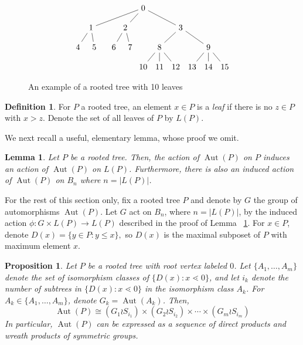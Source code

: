 \documentclass[smallextended, envcountsame, numbook]{svjour3}
\theoremstyle{plain}
\newtheorem{prop}[thm]{Proposition}
\newtheorem{lem}[thm]{Lemma}
\theoremstyle{definition}
\newtheorem{defn}[thm]{Definition}
\theoremstyle{remark}
\numberwithin{equation}{section}
\newcommand\Aut{\operatorname{Aut}}
\begin{document}
\begin{figure}[h!]
\[\begin{tikzpicture}[scale=.7]
  \node (0) at (-4,0) {$4$};
  \node (1) at (-3,0) {$5$};
  \node (2) at (-1.8,0) {$6$};
  \node (3) at (-0.8,0) {$7$};
    \node (4) at (0,-1.2) {$10$};
  \node (5) at (1,-1.2) {$11$};
  \node (6) at (2,-1.2) {$12$};
  \node (7) at (3,-1.2) {$13$};
  \node (8) at (4,-1.2) {$14$};
  \node (9) at (5,-1.2) {$15$};
  \node (10) at (1, 0) {$8$};
  \node (11) at (4,0) {$9$};
    \node (12) at (-3.2,1.2) {$1$};
  \node (13) at (-1.1,1.2) {$2$};
  \node (14) at (2.3,1.2) {$3$};
  \node (15) at (0,2.4) {$0$};
 \draw (0)--(12);
  \draw (1)--(12);
  \draw (2)--(13);
  \draw (3)--(13);
  \draw (4)--(10);
  \draw (5)--(10);
  \draw (6)--(10);
  \draw (7)--(11);
  \draw (8)--(11);
  \draw (9)--(11);
  \draw (10)--(14);
  \draw (11)--(14);
  \draw (12)--(15);
  \draw (13)--(15);
  \draw (14)--(15);
\end{tikzpicture}\]
\caption{\label{fig:tree2} An example of a rooted tree with 10  leaves}
\end{figure}

\begin{defn}
For $P$ a rooted tree, an element $x \in P$ is a {\it leaf} if there is no $z \in P$ with $x > z$. Denote the set of all leaves of $P$ by $L(P)$.
\end{defn}

We next recall a useful, elementary lemma, whose proof we omit.

\begin{lem}
\label{lem:induced_tree_action}
Let $P$ be a rooted tree. Then, the action of $\Aut(P)$ on $P$ induces an action of $\Aut(P)$ on $L(P)$. Furthermore, there is also an induced action of $\Aut(P)$ on $B_n$ where $n = |L(P)|$. 
\end{lem}

For the rest of this section only, fix a rooted tree $P$ and denote by $G$ the group of automorphisms $\Aut(P)$. Let $G$ act on $B_n$, where $n = |L(P)|$, by the induced action $\phi\colon G \times L(P) \rightarrow L(P)$ described in the proof of Lemma ~\ref{lem:induced_tree_action}.
For $x \in P$, denote $D(x) = \{y \in P\colon y \leq x\},$ so $D(x)$ is the maximal subposet of $P$ with maximum element $x$.

\begin{prop}
\label{prop:automorphism_trees}
Let $P$ be a rooted tree with root vertex labeled $0$. Let $\{A_1,\ldots,A_m\}$ denote the set of isomorphism classes of $\{D(x)\colon x\lessdot 0\}$, and let $i_k$ denote the number of subtrees in $\{D(x)\colon x\lessdot 0\}$ in the isomorphism class $A_k$. For $A_k \in \{A_1,\ldots,A_m\}$, denote $G_k = \Aut(A_k)$. Then, 
\begin{equation}
\label{eq:level_expansion}
\Aut(P) \cong (G_1 \wr S_{i_1}) \times (G_2 \wr S_{i_2}) \times \cdots \times (G_m\wr S_{i_m})
\end{equation}
In particular, $\Aut(P)$ can be expressed as a sequence of direct products and wreath products of symmetric groups.
\end{prop}
\end{document}
